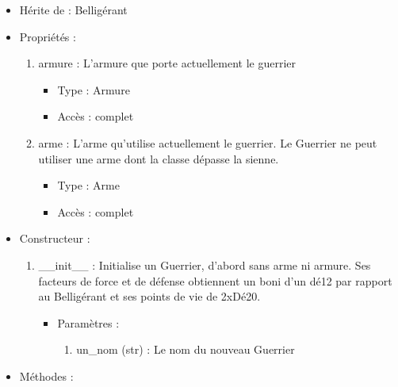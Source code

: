 \documentclass[12pt,pdftex,oneside]{article}
\begin{document}
  \begin{itemize}
  \item Hérite de : Belligérant
  \item Propriétés : 
    \begin{enumerate}
    \item armure : L'armure que porte actuellement le guerrier
          \begin{itemize}
          \item Type : Armure
          \item Accès : complet
          \end{itemize}
    \item arme : L'arme qu'utilise actuellement le guerrier. Le Guerrier ne peut
      utiliser une arme dont la classe dépasse la sienne.
          \begin{itemize}
          \item Type : Arme
          \item Accès : complet
          \end{itemize}

    \end{enumerate}

  \item Constructeur : 

  \begin{enumerate}
  \item \_\_init\_\_ : Initialise un Guerrier, d'abord sans arme ni armure. Ses
    facteurs de force et de défense obtiennent un boni d'un dé12 par rapport au
    Belligérant et ses points de vie de 2xDé20.
    \begin{itemize}
    \item Paramètres : 
      \begin{enumerate}
      \item un\_nom (str) : Le nom du nouveau Guerrier
      \end{enumerate}
    \end{itemize}

  \end{enumerate}

  \item Méthodes : 


\end{itemize}
\end{document}

